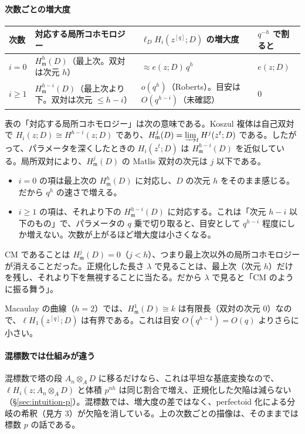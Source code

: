 \documentclass[11pt,a4paper]{ltjsarticle}
\numberwithin{equation}{section}
\theoremstyle{plain}
\theoremstyle{definition}
\theoremstyle{definition}
\newcommand{\m}{\mathfrak{m}}
\begin{document}
\paragraph{次数ごとの増大度}
\begin{center}
\small
\begin{tabularx}{\textwidth}{>{\raggedright}p{2.2cm}>{\raggedright}X>{\raggedright}p{3.2cm}>{\raggedright\arraybackslash}p{2.6cm}}
\toprule
次数 & 対応する局所コホモロジー & $\ell_D H_i(z^{[q]};D)$ の増大度 & $q^{-h}$ で割ると \\
\midrule
$i = 0$ & $H^h_\m(D)$（最上次。双対は次元 $h$） & $\approx e(z;D)\,q^h$ & $e(z;D)$ \\
$i\ge 1$ & $H^{h-i}_\m(D)$（最上次より下。双対は次元 $\le h-i$） & $o(q^h)$（Roberts）。目安は $O(q^{h-i})$（未確認） & $0$ \\
\bottomrule
\end{tabularx}
\end{center}
表の「対応する局所コホモロジー」は次の意味である。Koszul 複体は自己双対で $H_i(z;D)\cong H^{h-i}(z;D)$ であり、$H^j_\m(D) = \varinjlim_t H^j(z^t;D)$ である。したがって、パラメータを深くしたときの $H_i(z^t;D)$ は $H^{h-i}_\m(D)$ を近似している。局所双対により、$H^j_\m(D)$ の Matlis 双対の次元は $j$ 以下である。
\begin{itemize}
  \item $i = 0$ の項は最上次の $H^h_\m(D)$ に対応し、$D$ の次元 $h$ をそのまま感じる。だから $q^h$ の速さで増える。
  \item $i\ge 1$ の項は、それより下の $H^{h-i}_\m(D)$ に対応する。これは「次元 $h-i$ 以下のもの」で、パラメータの $q$ 乗で切り取ると、目安として $q^{h-i}$ 程度にしか増えない。次数が上がるほど増大度は小さくなる。
\end{itemize}
CM であることは $H^j_\m(D) = 0$（$j<h$）、つまり最上次以外の局所コホモロジーが消えることだった。正規化した長さ $\lambda$ で見ることは、最上次（次元 $h$）だけを残し、それより下を無視することに当たる。だから $\lambda$ で見ると「CM のように振る舞う」。

Macaulay の曲線（$h = 2$）では、$H^1_\m(D)\cong k$ は有限長（双対の次元 $0$）なので、$\ell H_1(z^{[q]};D)$ は有界である。これは目安 $O(q^{h-1}) = O(q)$ よりさらに小さい。

\paragraph{混標数では仕組みが違う}
混標数で塔の段 $A_n\otimes_A D$ に移るだけなら、これは平坦な基底変換なので、$\ell H_i(z;A_n\otimes_A D)$ と体積 $p^{nh}$ は同じ割合で増え、正規化した欠陥は減らない（\S\ref{sec:intuition-p}）。混標数では、増大度の差ではなく、perfectoid 化による分岐の希釈（見方 3）が欠陥を消している。上の次数ごとの描像は、そのままでは標数 $p$ の話である。
\end{document}
